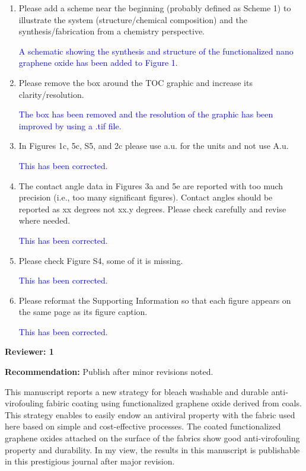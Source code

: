 \documentclass[12pt]{letter}
\newcommand{\blue}[1]{\textcolor{blue}{#1}} %
\begin{document}
\begin{enumerate}

\item 
Please add a 
scheme near the 
beginning (probably 
defined as Scheme 1) 
to illustrate the 
system 
(structure/chemical 
composition) and the 
synthesis/fabrication 
from a chemistry 
perspective.

\blue{A schematic showing the synthesis and structure of the functionalized nano graphene oxide has been added to Figure 1.}

\item 
Please remove the box 
around the TOC graphic and 
increase its clarity/resolution.

\blue{The box has been removed and the resolution of the graphic has been improved by using a .tif file.}

\item In Figures 1c, 5c, S5, and 2c please use a.u. for the units and not use A.u.

\blue{This has been corrected.}

\item The contact angle data in Figures 3a and 5e are reported with too much precision (i.e., too many significant figures). Contact angles should be reported as xx degrees not xx.y degrees. Please check carefully and revise where needed. 

\blue{This has been corrected.}

\item Please check Figure S4, some of it is missing.

\blue{This has been corrected.}

\item Please reformat the Supporting Information so that each figure appears on the same page as its figure caption.

\blue{This has been corrected.}

\end{enumerate}

\newpage

\textbf{Reviewer: 1}

\textbf{Recommendation:} Publish after minor revisions noted.

This manuscript reports a new strategy for bleach washable and durable anti-virofouling fabiric coating using functionalized graphene oxide derived from coals. This strategy enables to easily endow an antiviral property with the fabric used here based on simple and cost-effective processes. The coated functionalized graphene oxides attached on the surface of the fabrics show good anti-virofouling property and durability. In my view, the results in this manuscript is publishable in this prestigious journal after major revision.
\end{document}
